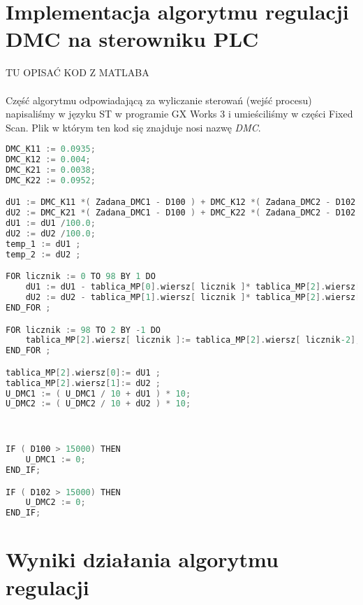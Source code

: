 \section{Implementacja algorytmu regulacji DMC na sterowniku PLC}
\label{thermal_dmc_impl}
TU OPISAĆ KOD Z MATLABA
~\\\\Część algorytmu odpowiadającą za wyliczanie sterowań (wejść procesu) napisaliśmy w języku ST w programie GX Works 3 i umieściliśmy w części Fixed Scan. Plik w którym ten kod się znajduje nosi nazwę \textit{DMC}.
\begin{lstlisting}[caption={Kod obliczający sterownanie dla regulatora dwuwymiarowego DMC (GX Works)}, language=C]
DMC_K11 := 0.0935;
DMC_K12 := 0.004;
DMC_K21 := 0.0038;
DMC_K22 := 0.0952;

dU1 := DMC_K11 *( Zadana_DMC1 - D100 ) + DMC_K12 *( Zadana_DMC2 - D102 ) ;
dU2 := DMC_K21 *( Zadana_DMC1 - D100 ) + DMC_K22 *( Zadana_DMC2 - D102 ) ;
dU1 := dU1 /100.0;
dU2 := dU2 /100.0;
temp_1 := dU1 ;
temp_2 := dU2 ;

FOR licznik := 0 TO 98 BY 1 DO
	dU1 := dU1 - tablica_MP[0].wiersz[ licznik ]* tablica_MP[2].wiersz[ licznik ];
	dU2 := dU2 - tablica_MP[1].wiersz[ licznik ]* tablica_MP[2].wiersz[ licznik ];
END_FOR ;

FOR licznik := 98 TO 2 BY -1 DO
	tablica_MP[2].wiersz[ licznik ]:= tablica_MP[2].wiersz[ licznik-2];
END_FOR ;

tablica_MP[2].wiersz[0]:= dU1 ;
tablica_MP[2].wiersz[1]:= dU2 ;
U_DMC1 := ( U_DMC1 / 10 + dU1 ) * 10; 
U_DMC2 := ( U_DMC2 / 10 + dU2 ) * 10; 



IF ( D100 > 15000) THEN
	U_DMC1 := 0;
END_IF;

IF ( D102 > 15000) THEN
	U_DMC2 := 0;
END_IF;
\end{lstlisting}

\section{Wyniki działania algorytmu regulacji}
\label{thermal_dmc_wyniki}

